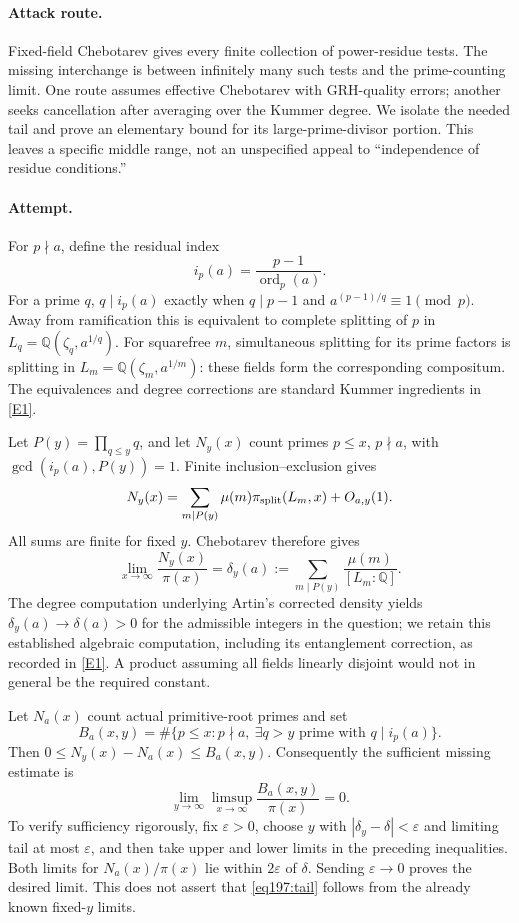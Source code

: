 \documentclass[11pt,a4paper]{article}
\newcommand{\Q}{\mathbb{Q}}
\newcommand{\eref}[2]{\hyperlink{extra:#1:#2}{[E#2]}}
\numberwithin{equation}{section}
\begin{document}
\paragraph{Attack route.}
Fixed-field Chebotarev gives every finite collection of power-residue tests. The missing interchange is between infinitely many such tests and the prime-counting limit. One route assumes effective Chebotarev with GRH-quality errors; another seeks cancellation after averaging over the Kummer degree. We isolate the needed tail and prove an elementary bound for its large-prime-divisor portion. This leaves a specific middle range, not an unspecified appeal to ``independence of residue conditions.''

\paragraph{Attempt.}
For $p\nmid a$, define the residual index
\[
 i_p(a)=\frac{p-1}{\operatorname{ord}_p(a)}.
\]
For a prime $q$, $q\mid i_p(a)$ exactly when $q\mid p-1$ and $a^{(p-1)/q}\equiv1\pmod p$. Away from ramification this is equivalent to complete splitting of $p$ in
$L_q=\Q(\zeta_q,a^{1/q})$. For squarefree $m$, simultaneous splitting for its prime factors is splitting in $L_m=\Q(\zeta_m,a^{1/m})$: these fields form the corresponding compositum. The equivalences and degree corrections are standard Kummer ingredients in \eref{197}{1}.

Let $P(y)=\prod_{q\le y}q$, and let $N_y(x)$ count primes $p\le x$, $p\nmid a$, with $\gcd(i_p(a),P(y))=1$. Finite inclusion--exclusion gives
\begin{equation}\label{eq197:finite}
 N_y(x)=\sum_{m\mid P(y)}\mu(m)\pi_{\rm split}(L_m,x)+O_{a,y}(1).
\end{equation}
All sums are finite for fixed $y$. Chebotarev therefore gives
\[
 \lim_{x\to\infty}\frac{N_y(x)}{\pi(x)}
 =\delta_y(a):=\sum_{m\mid P(y)}\frac{\mu(m)}{[L_m:\Q]}.
\]
The degree computation underlying Artin's corrected density yields
$\delta_y(a)\to\delta(a)>0$ for the admissible integers in the question; we retain this established algebraic computation, including its entanglement correction, as recorded in \eref{197}{1}. A product assuming all fields linearly disjoint would not in general be the required constant.

Let $N_a(x)$ count actual primitive-root primes and set
\[
 B_a(x,y)=\#\{p\le x:p\nmid a,\ \exists q>y\text{ prime with }q\mid i_p(a)\}.
\]
Then $0\le N_y(x)-N_a(x)\le B_a(x,y)$. Consequently the sufficient missing estimate is
\begin{equation}\label{eq197:tail}
 \lim_{y\to\infty}\limsup_{x\to\infty}
       \frac{B_a(x,y)}{\pi(x)}=0.
\end{equation}
To verify sufficiency rigorously, fix $\varepsilon>0$, choose $y$ with $|\delta_y-\delta|<\varepsilon$ and limiting tail at most $\varepsilon$, and then take upper and lower limits in the preceding inequalities. Both limits for $N_a(x)/\pi(x)$ lie within $2\varepsilon$ of $\delta$. Sending $\varepsilon\to0$ proves the desired limit. This does not assert that \eqref{eq197:tail} follows from the already known fixed-$y$ limits.
\end{document}
